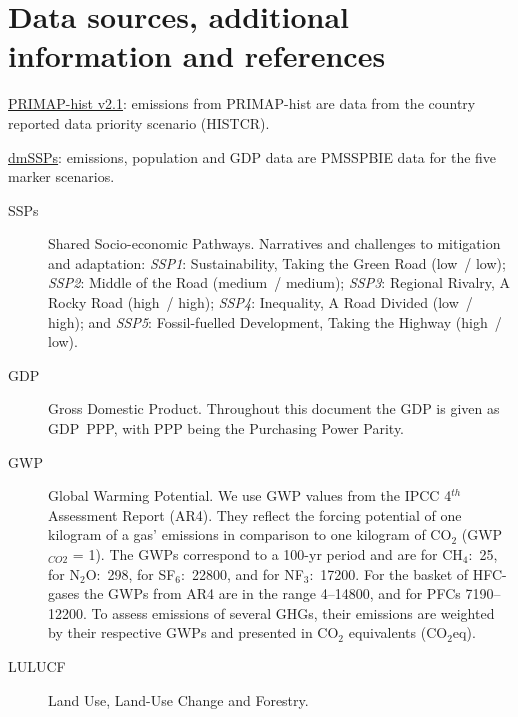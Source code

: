 \documentclass[12pt]{article}
\begin{document}
 \newpage %
 \section{Data sources, additional information and references}
 \label{sec:dataSourcesRefs}

 \noindent \href{https://dataservices.gfz-potsdam.de/pik/showshort.php?id=escidoc:4736895}{PRIMAP-hist v2.1}: emissions from PRIMAP-hist are data from the country reported data priority scenario (HISTCR).

 \noindent \href{https://zenodo.org/record/3638137#.X2syXouxU2w}{dmSSPs}: emissions, population and GDP data are PMSSPBIE data for the five marker scenarios.

 \begin{description}
 \item [SSPs] Shared Socio-economic Pathways. \newline
 Narratives and challenges to mitigation and adaptation: \newline
 \textit{SSP1}: Sustainability, Taking the Green Road (low~/ low); \newline
 \textit{SSP2}: Middle of the Road (medium~/ medium); \newline
 \textit{SSP3}: Regional Rivalry, A Rocky Road (high~/ high); \newline
 \textit{SSP4}: Inequality, A Road Divided (low~/ high); and \newline
 \textit{SSP5}: Fossil-fuelled Development, Taking the Highway (high~/ low).
 \item [GDP] Gross Domestic Product. \newline
 Throughout this document the GDP is given as GDP~PPP, with PPP being the Purchasing Power Parity.
 \item [GWP] Global Warming Potential. \newline
 We use GWP values from the IPCC 4$^{th}$ Assessment Report (AR4). 
 They reflect the forcing potential of one kilogram of a gas' emissions in comparison to one kilogram of CO$_2$ (GWP$_{CO2}$ = 1). 
 The GWPs correspond to a 100-yr period and are for CH$_4$:~25, for N$_2$O:~298, for SF$_6$:~22800, and for NF$_3$:~17200. 
 For the basket of HFC-gases the GWPs from AR4 are in the range 4--14800, and for PFCs 7190--12200. 
 To assess emissions of several GHGs, their emissions are weighted by their respective GWPs and presented in CO$_2$ equivalents (CO$_2$eq).
 \item [LULUCF] Land Use, Land-Use Change and Forestry. \newline

\end{description}
\end{document}
